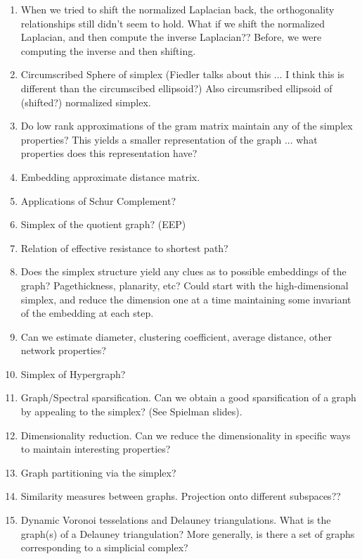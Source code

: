 \begin{enumerate}
\item When we tried to shift the normalized Laplacian back, the orthogonality relationships still didn't seem to hold. What if we shift the normalized Laplacian, and then compute the inverse Laplacian?? Before, we were computing the inverse and then shifting.  
\item Circumscribed Sphere of simplex (Fiedler talks about this ... I think this is different than the circumscibed ellipsoid?) Also circumsribed ellipsoid of (shifted?) normalized simplex. 
\item Do low rank approximations of the gram matrix maintain any of the simplex properties? This yields a smaller representation of the graph ... what properties does this representation have?
\item Embedding approximate distance matrix. 
\item Applications of Schur Complement? 
    \item Simplex of the quotient graph? (EEP)
    \item Relation of effective resistance to shortest path?
    \item Does the simplex structure yield any clues as to possible embeddings of the graph? Pagethickness, planarity, etc? Could start with the high-dimensional simplex, and reduce the dimension one at a time maintaining some invariant of the embedding at each step. 
    \item Can we estimate diameter, clustering coefficient, average distance, other network properties?
    \item Simplex of Hypergraph? 
    \item Graph/Spectral sparsification. Can we obtain a good sparsification of a graph by appealing to the simplex? (See Spielman slides). 
    \item Dimensionality reduction. Can we reduce the dimensionality in specific ways to maintain interesting properties? 
    \item Graph partitioning via the simplex? 
    \item Similarity measures between graphs. Projection onto different subspaces??
    \item Dynamic Voronoi tesselations and Delauney triangulations. What is the graph(s) of a Delauney triangulation? More generally, is there a set of graphs corresponding to a simplicial complex? 


\end{enumerate}
